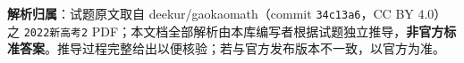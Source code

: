 

\begin{gknotice}
\textbf{解析归属}：试题原文取自 deekur/gaokaomath（commit \texttt{34c13a6}，CC BY 4.0）之 \texttt{2022新高考2} PDF；本文档全部解析由本库编写者根据试题独立推导，\textbf{非官方标准答案}。推导过程完整给出以便核验；若与官方发布版本不一致，以官方为准。
\end{gknotice}

\par\medskip


